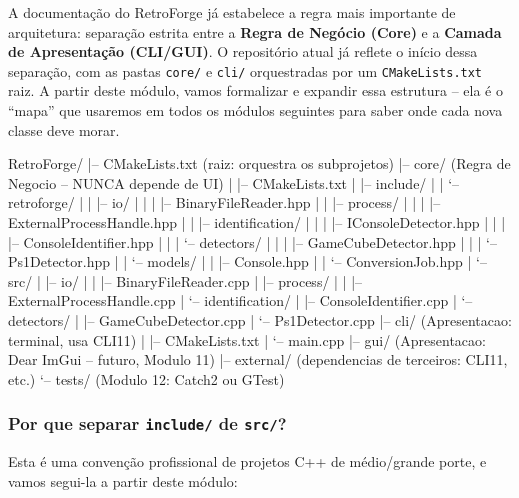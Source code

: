 A documentação do RetroForge já estabelece a regra mais importante de arquitetura: separação estrita entre a \textbf{Regra de Negócio (Core)} e a \textbf{Camada de Apresentação (CLI/GUI)}. O repositório atual já reflete o início dessa separação, com as pastas \texttt{core/} e \texttt{cli/} orquestradas por um \texttt{CMakeLists.txt} raiz. A partir deste módulo, vamos formalizar e expandir essa estrutura -- ela é o ``mapa'' que usaremos em todos os módulos seguintes para saber onde cada nova classe deve morar.

\begin{CaixaArvore}
RetroForge/
|-- CMakeLists.txt              (raiz: orquestra os subprojetos)
|-- core/                       (Regra de Negocio -- NUNCA depende de UI)
|   |-- CMakeLists.txt
|   |-- include/
|   |   `-- retroforge/
|   |       |-- io/
|   |       |   |-- BinaryFileReader.hpp
|   |       |-- process/
|   |       |   |-- ExternalProcessHandle.hpp
|   |       |-- identification/
|   |       |   |-- IConsoleDetector.hpp
|   |       |   |-- ConsoleIdentifier.hpp
|   |       |   `-- detectors/
|   |       |       |-- GameCubeDetector.hpp
|   |       |       `-- Ps1Detector.hpp
|   |       `-- models/
|   |           |-- Console.hpp
|   |           `-- ConversionJob.hpp
|   `-- src/
|       |-- io/
|       |   |-- BinaryFileReader.cpp
|       |-- process/
|       |   |-- ExternalProcessHandle.cpp
|       `-- identification/
|           |-- ConsoleIdentifier.cpp
|           `-- detectors/
|               |-- GameCubeDetector.cpp
|               `-- Ps1Detector.cpp
|-- cli/                        (Apresentacao: terminal, usa CLI11)
|   |-- CMakeLists.txt
|   `-- main.cpp
|-- gui/                        (Apresentacao: Dear ImGui -- futuro, Modulo 11)
|-- external/                   (dependencias de terceiros: CLI11, etc.)
`-- tests/                      (Modulo 12: Catch2 ou GTest)
\end{CaixaArvore}

\subsubsection{Por que separar \texttt{include/} de \texttt{src/}?}

Esta é uma convenção profissional de projetos C++ de médio/grande porte, e vamos segui-la a partir deste módulo:

